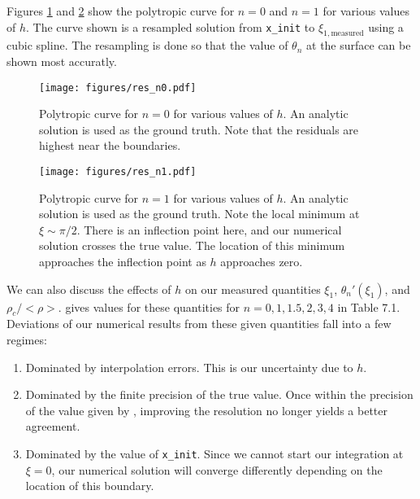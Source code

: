 \documentclass[twocolumn]{aastex631}
\begin{document}
Figures \ref{fig:res_n0} and \ref{fig:res_n1} show the
polytropic curve for $n=0$ and $n=1$ for various
values of $h$. The curve shown is a resampled solution from
\texttt{x\_init} to $\xi_{1,\text{measured}}$ using a cubic spline.
The resampling is done so that the value of $\theta_n$ at
the surface can be shown most accuratly.



\begin{figure}[h]
    \begin{centering}
        \texttt{[image: figures/res\_n0.pdf]}
        \caption{Polytropic curve for $n=0$ for various
        values of $h$. An analytic solution is used as
        the ground truth. Note that the residuals are highest
        near the boundaries.}
        \label{fig:res_n0}
    \end{centering}
\end{figure}

\begin{figure}[h]
    \begin{centering}
        \texttt{[image: figures/res\_n1.pdf]}
        \caption{Polytropic curve for $n=1$ for various
        values of $h$. An analytic solution is used as
        the ground truth. Note the local minimum at
        $\xi\sim \pi/2$. There is an inflection point here,
        and our numerical solution crosses the true value.
        The location of this minimum approaches the inflection
        point as $h$ approaches zero.}
        \label{fig:res_n1}
    \end{centering}
\end{figure}

We can also discuss the effects of $h$ on our measured quantities
$\xi_1$, $\theta_n'(\xi_1)$, and $\rho_c/<\rho>$. \citet{textbook}
gives values for these quantities for $n=0,1,1.5,2,3,4$ in Table 7.1.
Deviations of our numerical results from these given quantities fall
into a few regimes:

\begin{enumerate}
    \item Dominated by interpolation errors. This is our uncertainty
    due to $h$. \label{it:interp}
    \item Dominated by the finite precision of the true value. Once
    within the precision of the value given by \citet{textbook},
    improving the resolution no longer yields a better agreement.
    \label{it:prec}
    \item Dominated by the value of \texttt{x\_init}. Since we
    cannot start our integration at $\xi=0$, our numerical solution
    will converge differently depending on the location of this boundary.
    \label{it:init}
\end{enumerate}
\end{document}
